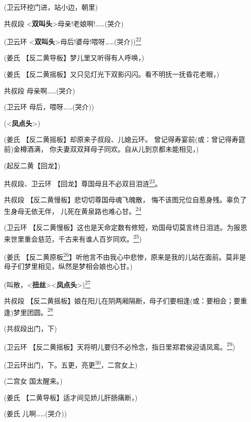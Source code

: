 (卫云环挖门进，站小边，朝里)

共叔段
\textless{}\textbf{双叫头}\textgreater{}母亲!老娘啊!\ldots{}\ldots{}(哭介)

(卫云环
\textless{}\textbf{双叫头}\textgreater{}母后!婆母!喂呀\ldots{}\ldots{}(哭介))\protect\hyperlink{fn22}{\textsuperscript{22}}

(姜氏 【反二黄导板】梦儿里又听得有人呼唤，)

(姜氏 【反二黄摇板】又只见灯光下双影闪闪。看不明抚一抚昏花老眼，)

共叔段 母亲啊\ldots{}\ldots{}(哭介)

(卫云环 母后，喂呀\ldots{}\ldots{}(哭介))

(\textless{}\textbf{凤点头}\textgreater{})

(姜氏 【反二黄摇板】却原来子叔段、儿媳云环。
曾记得寿宴前(或：曾记得寿筵前)金樽酒满，
你夫妻双双拜母子同欢。自从儿到京都未能相见，)

(起反二黄【回龙】)

共叔段、卫云环
【回龙】尊国母且不必双目泪涟\protect\hyperlink{fn23}{\textsuperscript{23}}。

共叔段 【反二黄慢板】悲切切尊国母魂飞魄散，
悔不该图兄位自惹身残。辜负了生身母无依无伴，
儿死在黄泉路也难心甘。\protect\hyperlink{fn24}{\textsuperscript{24}}

(卫云环
【反二黄慢板】这也是天命定数有修短，劝国母切莫言终日泪涟。为报恩来世里重会慈范，千古来有谁人百岁同欢。\protect\hyperlink{fn25}{\textsuperscript{25}})

(姜氏
【反二黄原板\protect\hyperlink{fn26}{\textsuperscript{26}}】听他言不由我心中悲惨，原来是我的儿站在面前。莫非是母子们梦里相见，纵然是梦相会娘也心甘。)

(叫散，\textless{}\textbf{扭丝}\textgreater{}\textless{}\textbf{凤点头}\textgreater{})\protect\hyperlink{fn27}{\textsuperscript{27}}

共叔段
【反二黄摇板】娘在阳儿在阴两厢隔断，母子们要相逢(或：要相会；要重逢)梦里团圆。\protect\hyperlink{fn28}{\textsuperscript{28}}

(共叔段出门，下)

(卫云环
【反二黄摇板】天将明儿要归不必怜念，指日里郑君侯迎请凤鸾。\protect\hyperlink{fn29}{\textsuperscript{29}})

(卫云环出门，下。五更，亮更\protect\hyperlink{fn30}{\textsuperscript{30}}，二宫女上)

(二宫女 国太醒来。)

(姜氏 【二黄导板】适才间见娇儿肝肠痛断，)

(姜氏 儿啊\ldots{}\ldots{}(哭介))

